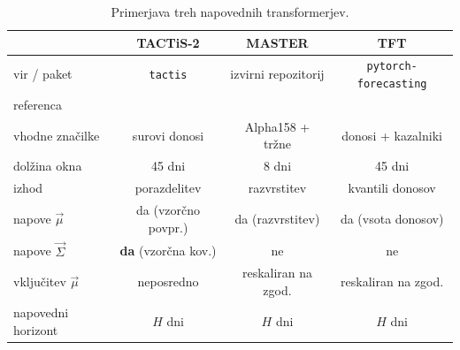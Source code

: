 \begin{table}[htbp]
  \centering
  \caption{Primerjava treh napovednih transformerjev.}
  \label{tab:hp-model}
  \small
  \begin{tabular}{lccc}
    \toprule
     & \textbf{TACTiS-2} & \textbf{MASTER} & \textbf{TFT}\\
    \midrule
    vir / paket        & \texttt{tactis} & izvirni repozitorij & \texttt{pytorch-forecasting}\\
    referenca          & \cite{ashok2024tactis} & \cite{li2024master} & \cite{lim2021tft}\\
    vhodne značilke    & surovi donosi & Alpha158 + tržne & donosi + kazalniki\\
    dolžina okna       & 45 dni & 8 dni & 45 dni\\
    izhod              & porazdelitev & razvrstitev & kvantili donosov\\
    napove $\vec{\mu}$ & da (vzorčno povpr.) & da (razvrstitev) & da (vsota donosov)\\
    napove $\vec{\Sigma}$ & \textbf{da} (vzorčna kov.) & ne & ne\\
    vključitev $\vec{\mu}$ & neposredno & reskaliran na zgod. & reskaliran na zgod.\\
    napovedni horizont & $H$ dni & $H$ dni & $H$ dni\\
    \bottomrule
  \end{tabular}
\end{table}
